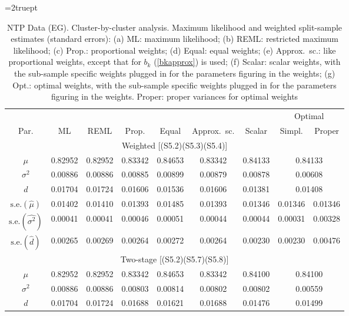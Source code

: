 \documentclass[11pt,a5paper,twoside]{book}
\begin{document}
\begin{table}[!t]
\begin{center}
\caption[Cluster-by-cluster analysis, EG]{\linespread{1}\small  NTP Data (EG). Cluster-by-cluster analysis. Maximum likelihood and weighted split-sample estimates (standard errors): (a) ML: maximum likelihood; (b) REML: restricted maximum likelihood; (c) Prop.: proportional weights; (d) Equal: equal weights; (e) Approx.~sc.: like proportional weights, except that for $b_k$ (\ref{bkapprox}) is used; (f) Scalar: scalar weights, with the sub-sample specific weights plugged in for the parameters figuring in the weights; (g) Opt.: optimal weights, with the sub-sample specific weights plugged in for the parameters figuring in the weights. Proper: proper variances for optimal weights \label{ntpestimatestable5}}


\vspace*{2mm}

\def\arraystretch{0.6}\small\tabcolsep=2truept \begin{tabular}{ccccccccc}
\hline\hline
     &   &     &      &             &         &      & \multicolumn{2}{c}{Optimal}\\
\cline{8-9}
 Par.& ML& REML& Prop.& Equal       & Approx.~sc.&Scalar& Simpl. & Proper\\
\hline
\hline
\multicolumn{9}{c}{{Weighted [(S5.2)(S5.3)(S5.4)]}}\\
\hline
$\mu$ & 0.82952 & 0.82952 & 0.83342 & 0.84653 & 0.83342 & 0.84133 & \multicolumn{2}{c}{0.84133}  \\
$\sigma^2$ & 0.00886 & 0.00886 & 0.00885 & 0.00899 & 0.00879 & 0.00878 & \multicolumn{2}{c}{0.00608}  \\
$d$ & 0.01704 & 0.01724 & 0.01606 & 0.01536 & 0.01606 & 0.01381 & \multicolumn{2}{c}{0.01408}  \\
\hline
$\mbox{s.e.}(\widehat{\mu})$ & 0.01402 & 0.01410 & 0.01393 & 0.01485 & 0.01393 & 0.01346 & 0.01346 & 0.01346 \\
$\mbox{s.e.}(\widehat{\sigma^2})$ & 0.00041 & 0.00041 & 0.00046 & 0.00051 & 0.00044 & 0.00044 & 0.00031 & 0.00328 \\
  $\mbox{s.e.}(\widehat{d})$& 0.00265 & 0.00269 & 0.00264 & 0.00272 & 0.00264 & 0.00230 & 0.00230 & 0.00476 \\
\hline\hline
\multicolumn{9}{c}{{Two-stage [(S5.2)(S5.7)(S5.8)]}}\\
\hline
$\mu$ & 0.82952 & 0.82952 & 0.83342 & 0.84653 & 0.83342 & 0.84100 & \multicolumn{2}{c}{0.84100}   \\
$\sigma^2$ & 0.00886 & 0.00886 & 0.00803 & 0.00814 & 0.00802 & 0.00802 & \multicolumn{2}{c}{0.00559}  \\
$d$& 0.01704 & 0.01724 & 0.01688 & 0.01621 & 0.01688 & 0.01476 & \multicolumn{2}{c}{0.01499}  \\


\end{tabular}
\end{center}
\end{table}
\end{document}
